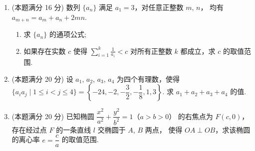 \documentclass{chsmc}
\begin{document}
\begin{enumerate}[resume]
	\item (本题满分 16 分) 数列 $\{a_n\}$ 满足 $a_1 = 3$，对任意正整数 $m$, $n$，
		均有 $a_{m+n} = a_m + a_n + 2mn$.
		\begin{enumerate}[(1)]
			\item 求 $\{a_n\}$ 的通项公式;
			\item 如果存在实数 $c$ 使得 $\displaystyle\sum_{i=1}^{k} \frac{1}{a_i} < c$
				对所有正整数 $k$ 都成立，求 $c$ 的取值范围.
		\end{enumerate}
	\item (本题满分 20 分) 设 $a_1$, $a_2$, $a_3$, $a_4$ 为四个有理数，使得
		$\{a_i a_j \mid 1 \leqslant i < j \leqslant 4\} = \left\{-24,-2,-\dfrac{3}{2},-\dfrac{1}{8},1,3\right\}$.
		求 $a_1+a_2+a_3+a_4$ 的值.
	\item (本题满分 20 分) 已知椭圆 $\dfrac{x^2}{a^2} + \dfrac{y^2}{b^2} = 1$（$a > b > 0$）
		的右焦点为 $F(c,0)$，存在经过点 $F$ 的一条直线 $l$ 交椭圆于 $A$, $B$ 两点，
		使得 $OA \perp OB$，求该椭圆的离心率 $e = \dfrac{c}{a}$ 的取值范围.
\end{enumerate}
\end{document}
